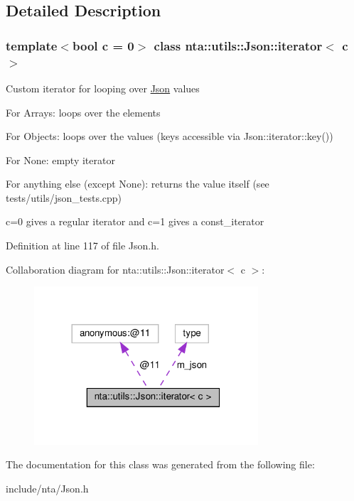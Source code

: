 \subsection{Detailed Description}
\subsubsection*{template$<$bool c = 0$>$\newline
class nta\+::utils\+::\+Json\+::iterator$<$ c $>$}

Custom iterator for looping over \hyperlink{classnta_1_1utils_1_1Json}{Json} values

For Arrays\+: loops over the elements

For Objects\+: loops over the values (keys accessible via Json\+::iterator\+::key())

For None\+: empty iterator

For anything else (except None)\+: returns the value itself (see tests/utils/json\+\_\+tests.\+cpp)

c=0 gives a regular iterator and c=1 gives a const\+\_\+iterator 

Definition at line 117 of file Json.\+h.



Collaboration diagram for nta\+:\+:utils\+:\+:Json\+:\+:iterator$<$ c $>$\+:\nopagebreak
\begin{figure}[H]
\begin{center}
\leavevmode
\includegraphics[width=236pt]{da/dc2/classnta_1_1utils_1_1Json_1_1iterator__coll__graph}
\end{center}
\end{figure}


The documentation for this class was generated from the following file\+:\begin{DoxyCompactItemize}
\item 
include/nta/Json.\+h\end{DoxyCompactItemize}
